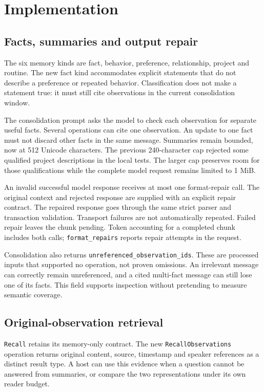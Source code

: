 \documentclass[11pt]{article}
\begin{document}
\section{Implementation}
\subsection{Facts, summaries and output repair}
The six memory kinds are fact, behavior, preference, relationship, project and routine. The new fact kind accommodates explicit statements that do not describe a preference or repeated behavior. Classification does not make a statement true: it must still cite observations in the current consolidation window.

The consolidation prompt asks the model to check each observation for separate useful facts. Several operations can cite one observation. An update to one fact must not discard other facts in the same message. Summaries remain bounded, now at 512 Unicode characters. The previous 240-character cap rejected some qualified project descriptions in the local tests. The larger cap preserves room for those qualifications while the complete model request remains limited to 1 MiB.

An invalid successful model response receives at most one format-repair call. The original context and rejected response are supplied with an explicit repair contract. The repaired response goes through the same strict parser and transaction validation. Transport failures are not automatically repeated. Failed repair leaves the chunk pending. Token accounting for a completed chunk includes both calls; \texttt{format\_repairs} reports repair attempts in the request.

Consolidation also returns \texttt{unreferenced\_observation\_ids}. These are processed inputs that supported no operation, not proven omissions. An irrelevant message can correctly remain unreferenced, and a cited multi-fact message can still lose one of its facts. This field supports inspection without pretending to measure semantic coverage.

\subsection{Original-observation retrieval}
\texttt{Recall} retains its memory-only contract. The new \texttt{RecallObservations} operation returns original content, source, timestamp and speaker references as a distinct result type. A host can use this evidence when a question cannot be answered from summaries, or compare the two representations under its own reader budget.
\end{document}
